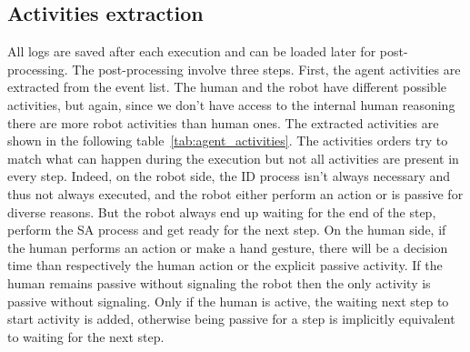 \subsection{Activities extraction}

All logs are saved after each execution and can be loaded later for post-processing. The post-processing involve three steps. First, the agent activities are extracted from the event list. The human and the robot have different possible activities, but again, since we don't have access to the internal human reasoning there are more robot activities than human ones. The extracted activities are shown in the following table~\ref{tab:agent_activities}. The activities orders try to match what can happen during the execution but not all activities are present in every step. Indeed, on the robot side, the ID process isn't always necessary and thus not always executed, and the robot either perform an action or is passive for diverse reasons. But the robot always end up waiting for the end of the step, perform the SA process and get ready for the next step. On the human side, if the human performs an action or make a hand gesture, there will be a decision time than respectively the human action or the explicit passive activity. If the human remains passive without signaling the robot then the only activity is passive without signaling. Only if the human is active, the waiting next step to start activity is added, otherwise being passive for a step is implicitly equivalent to waiting for the next step.  

